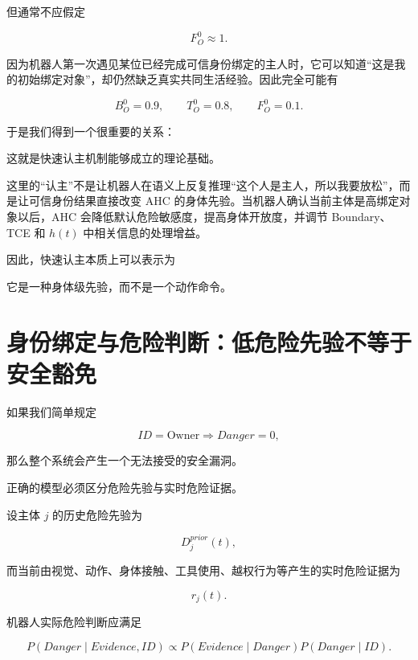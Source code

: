但通常不应假定

\[
F_O^0\approx 1.
\]

因为机器人第一次遇见某位已经完成可信身份绑定的主人时，它可以知道“这是我的初始绑定对象”，却仍然缺乏真实共同生活经验。因此完全可能有

\[
B_O^0=0.9,
\qquad
T_O^0=0.8,
\qquad
F_O^0=0.1.
\]

于是我们得到一个很重要的关系：

\begin{statementbox}
\centering
{}
\end{statementbox}

这就是快速认主机制能够成立的理论基础。

这里的“认主”不是让机器人在语义上反复推理“这个人是主人，所以我要放松”，而是让可信身份结果直接改变 AHC 的身体先验。当机器人确认当前主体是高绑定对象以后，AHC 会降低默认危险敏感度，提高身体开放度，并调节 Boundary、TCE 和 $h(t)$ 中相关信息的处理增益。

因此，快速认主本质上可以表示为

\begin{statementbox}
\centering
{}
\end{statementbox}

它是一种身体级先验，而不是一个动作命令。


\section{身份绑定与危险判断：低危险先验不等于安全豁免}

如果我们简单规定

\[
ID=\mathrm{Owner}
\Rightarrow
Danger=0,
\]

那么整个系统会产生一个无法接受的安全漏洞。

正确的模型必须区分危险先验与实时危险证据。

设主体 $j$ 的历史危险先验为

\[
D_j^{prior}(t),
\]

而当前由视觉、动作、身体接触、工具使用、越权行为等产生的实时危险证据为

\[
r_j(t).
\]

机器人实际危险判断应满足

\[
P(Danger\mid Evidence,ID)
\propto
P(Evidence\mid Danger)
P(Danger\mid ID).
\]

